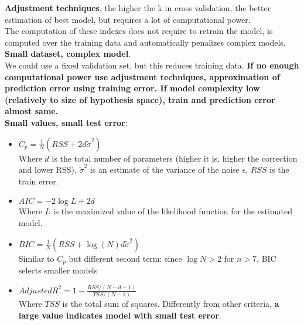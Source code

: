     \textbf{Adjustment techniques}, the higher the k in cross validation, the better estimation of best model, but requires a lot of computational power.\\
    The computation of these indexes does not require to retrain the model, is computed over the training data and automatically penalizes complex models.\\
    \textbf{Small dataset, complex model}.\\
    We could use a fixed validation set, but this reduces training data. \textbf{If no enough computational power use adjustment techniques, approximation of prediction error using training error. If model complexity low (relatively to size of hypothesis space), train and prediction error almost same.\\
    Small values, small test error}:
    \begin{itemize}
        \item $C_p=\frac{1}{N}(RSS+2d\tilde{\sigma}^2)$\\
        Where $d$ is the total number of parameters (higher it is, higher the correction and lower RSS), $\tilde{\sigma}^2$ is an estimate of the variance of the noise $\epsilon$, $RSS$ is the train error. 
        \item $AIC=-2\log L+2d$\\
        Where $L$ is the maximized value of the likelihood function for the estimated model.
        \item $BIC=\frac{1}{N}(RSS+\log(N)d\tilde{\sigma}^2)$\\
        Similar to $C_p$ but different second term: since $\log N > 2$ for $n>7$, BIC selects smaller models
        \item $AdjustedR^2=1-\frac{RSS/(N-d-1)}{TSS/(N-1)}$\\
        Where $TSS$ is the total sum of squares. Differently from other criteria, \textbf{a large value indicates model with small test error}.
    \end{itemize}
